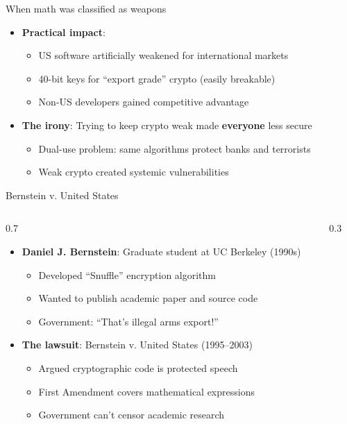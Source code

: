\ifdefined\PRESENTATION\else\PassOptionsToClass{handout}{beamer}\fi\documentclass[aspectratio=169, lualatex]{beamer}
\begin{document}
\begin{frame}{When math was classified as weapons}
	\begin{itemize}
		\item \textbf{Practical impact}:
		      \begin{itemize}
			      \item US software artificially weakened for international markets
			      \item 40-bit keys for ``export grade'' crypto (easily breakable)
			      \item Non-US developers gained competitive advantage
		      \end{itemize}
		\item \textbf{The irony}: Trying to keep crypto weak made \textbf{everyone} less secure
		      \begin{itemize}
			      \item Dual-use problem: same algorithms protect banks and terrorists
			      \item Weak crypto created systemic vulnerabilities
		      \end{itemize}
	\end{itemize}
\end{frame}

\begin{frame}{Bernstein v. United States}
	\begin{columns}[c]
		\begin{column}{0.7\textwidth}
			\begin{itemize}
				\item \textbf{Daniel J. Bernstein}: Graduate student at UC Berkeley (1990s)
				      \begin{itemize}
					      \item Developed ``Snuffle'' encryption algorithm
					      \item Wanted to publish academic paper and source code
					      \item Government: ``That's illegal arms export!''
				      \end{itemize}
				\item \textbf{The lawsuit}: Bernstein v. United States (1995--2003)
				      \begin{itemize}
					      \item Argued cryptographic code is protected speech
					      \item First Amendment covers mathematical expressions
					      \item Government can't censor academic research
				      \end{itemize}
			\end{itemize}
		\end{column}
		\begin{column}{0.3\textwidth}
		\end{column}
	\end{columns}
\end{frame}
\end{document}
